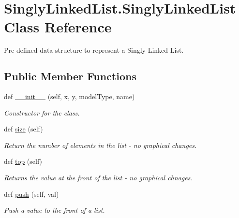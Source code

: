 \hypertarget{class_singly_linked_list_1_1_singly_linked_list}{}\section{Singly\+Linked\+List.\+Singly\+Linked\+List Class Reference}
\label{class_singly_linked_list_1_1_singly_linked_list}


Pre-\/defined data structure to represent a Singly Linked List.  


\subsection*{Public Member Functions}
\begin{DoxyCompactItemize}
\item 
def \hyperlink{class_singly_linked_list_1_1_singly_linked_list_a2e508ae2b37528ee587753422068f144}{\+\_\+\+\_\+init\+\_\+\+\_\+} (self, x, y, model\+Type, name)
\begin{DoxyCompactList}\small\item\em Constructor for the class. \end{DoxyCompactList}\item 
def \hyperlink{class_singly_linked_list_1_1_singly_linked_list_a96f6f50cf9bed918fe1f5248c1649f0c}{size} (self)
\begin{DoxyCompactList}\small\item\em Return the number of elements in the list -\/ no graphical changes. \end{DoxyCompactList}\item 
\mbox{\label{class_singly_linked_list_1_1_singly_linked_list_af6f27944245081ce67217ffc2a875a76}} 
def \hyperlink{class_singly_linked_list_1_1_singly_linked_list_af6f27944245081ce67217ffc2a875a76}{top} (self)
\begin{DoxyCompactList}\small\item\em Returns the value at the front of the list -\/ no graphical chnages. \end{DoxyCompactList}\item 
def \hyperlink{class_singly_linked_list_1_1_singly_linked_list_a7e948d77c8c645f33f4fea05844e7a76}{push} (self, val)
\begin{DoxyCompactList}\small\item\em Push a value to the front of a list. \end{DoxyCompactList}\item 

\end{DoxyCompactItemize}
